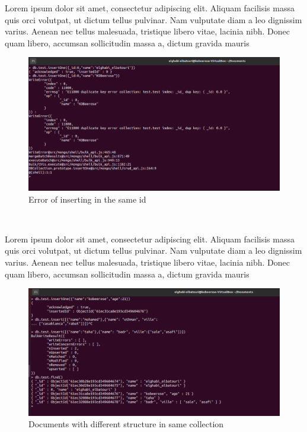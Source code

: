 \begin{spacing}{1.2}
\par Lorem ipsum dolor sit amet, consectetur adipiscing elit. Aliquam facilisis massa quis orci volutpat, ut dictum tellus pulvinar. Nam vulputate diam a leo dignissim varius. Aenean nec tellus malesuada, tristique libero vitae, lacinia nibh. Donec quam libero, accumsan sollicitudin massa a, dictum gravida mauris
\\
\begin{figure}[!htb] 
\begin{center} 
\includegraphics[width=1\linewidth]{Pictures/MongoDB/Examining MongoDB Query Features/Inserting documents/Error of inserting in the same id} 
\end{center} 
\caption{Error of inserting in the same id} 
\end{figure}  \FloatBarrier
\\

\par Lorem ipsum dolor sit amet, consectetur adipiscing elit. Aliquam facilisis massa quis orci volutpat, ut dictum tellus pulvinar. Nam vulputate diam a leo dignissim varius. Aenean nec tellus malesuada, tristique libero vitae, lacinia nibh. Donec quam libero, accumsan sollicitudin massa a, dictum gravida mauris
\\
\begin{figure}[!htb] 
\begin{center} 
\includegraphics[width=1\linewidth]{Pictures/MongoDB/Examining MongoDB Query Features/Inserting documents/Documents with different structure in same collection} 
\end{center} 
\caption{Documents with different structure in same collection} 
\end{figure}  \FloatBarrier
\\

\end{spacing}
